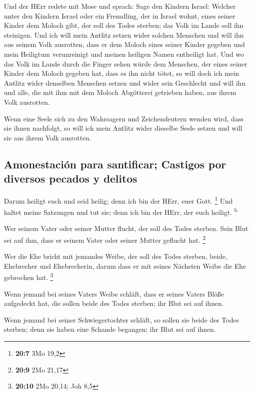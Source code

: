  Und der HErr redete mit Mose und sprach: 
Sage den Kindern Israel: Welcher unter den Kindern Israel oder ein
Fremdling, der in Israel wohnt, eines seiner Kinder dem Moloch gibt, der
soll des Todes sterben; das Volk im Lande soll ihn steinigen.
 Und ich will mein Antlitz setzen wider solchen Menschen
und will ihn aus seinem Volk ausrotten, dass er dem Moloch eines seiner
Kinder gegeben und mein Heiligtum verunreinigt und meinen heiligen Namen
entheiligt hat.  Und wo das Volk im Lande durch die Finger
sehen würde dem Menschen, der eines seiner Kinder dem Moloch gegeben
hat, dass es ihn nicht tötet,  so will doch ich mein
Antlitz wider denselben Menschen setzen und wider sein Geschlecht und
will ihn und alle, die mit ihm mit dem Moloch Abgötterei getrieben
haben, aus ihrem Volk ausrotten.

 Wenn eine Seele sich zu den Wahrsagern und Zeichendeutern
wenden wird, dass sie ihnen nachfolgt, so will ich mein Antlitz wider
dieselbe Seele setzen und will sie aus ihrem Volk ausrotten.

\hypertarget{amonestaciuxf3n-para-santificar-castigos-por-diversos-pecados-y-delitos}{%
\subsection{Amonestación para santificar; Castigos por diversos pecados
y
delitos}\label{amonestaciuxf3n-para-santificar-castigos-por-diversos-pecados-y-delitos}}

 Darum heiligt euch und seid heilig; denn ich bin der
HErr, euer Gott. \footnote{\textbf{20:7} 3Mo 19,2}  Und
haltet meine Satzungen und tut sie; denn ich bin der HErr, der euch
heiligt. \textsuperscript{b}

 Wer seinem Vater oder seiner Mutter flucht, der soll des
Todes sterben. Sein Blut sei auf ihm, dass er seinem Vater oder seiner
Mutter geflucht hat. \footnote{\textbf{20:9} 2Mo 21,17}

 Wer die Ehe bricht mit jemandes Weibe, der soll des
Todes sterben, beide, Ehebrecher und Ehebrecherin, darum dass er mit
seines Nächsten Weibe die Ehe gebrochen hat. \footnote{\textbf{20:10}
  2Mo 20,14; Joh 8,5}

 Wenn jemand bei seines Vaters Weibe schläft, dass er
seines Vaters Blöße aufgedeckt hat, die sollen beide des Todes sterben;
ihr Blut sei auf ihnen.

 Wenn jemand bei seiner Schwiegertochter schläft, so
sollen sie beide des Todes sterben; denn sie haben eine Schande
begangen; ihr Blut sei auf ihnen.

